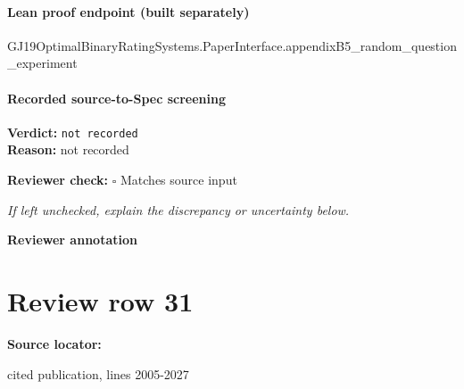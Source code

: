 \documentclass[10pt]{article}
\newcommand{\reviewerbox}{%
  \par\noindent\fbox{\parbox{0.96\linewidth}{\rule{0pt}{0.38in}}}\par
}
\newcommand{\reviewmatch}[1]{%
  \par\noindent\textbf{Reviewer check:} $\square$\; #1\par
  \noindent\emph{If left unchecked, explain the discrepancy or uncertainty below.}\par
}
\begin{document}
\paragraph{Lean proof endpoint (built separately)}\begin{ReviewVerbatim}
GJ19OptimalBinaryRatingSystems.PaperInterface.appendixB5_random_question_experiment
\end{ReviewVerbatim}

\paragraph{Recorded source-to-Spec screening}
\textbf{Verdict:} \texttt{not recorded}
\\
\textbf{Reason:} not recorded
\reviewmatch{Matches source input}
\noindent\textbf{Reviewer annotation}\par
\reviewerbox
\clearpage
\hypertarget{source-claim-8ccc8a8f737a5e7c}{}
\section*{Review row 31}
\textbf{Source locator:} {\footnotesize\raggedright cited publication, lines 2005-\allowbreak{}2027\par}
\end{document}

